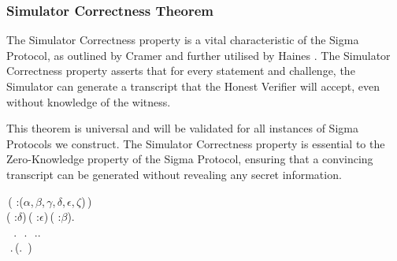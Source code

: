 \subsubsection{Simulator Correctness Theorem}
The Simulator Correctness property is a vital characteristic of the Sigma Protocol, as outlined by Cramer \cite{Cramer1997ModularDO} and further utilised by Haines \cite{Haines2019VerifiedVF}. The Simulator Correctness property asserts that for every statement and challenge, the Simulator can generate a transcript that the Honest Verifier will accept, even without knowledge of the witness. 

This theorem is universal and will be validated for all instances of Sigma Protocols we construct. The Simulator Correctness property is essential to the Zero-Knowledge property of the Sigma Protocol, ensuring that a convincing transcript can be generated without revealing any secret information. 

\begin{holmath}
    \,( :(\ensuremath{\alpha},\,\ensuremath{\beta},\,\ensuremath{\gamma},\,\ensuremath{\delta},\,\ensuremath{\epsilon},\,\ensuremath{\zeta})\,)\,\HOLSymConst{\HOLTokenEquiv{}}\\
\HOLSymConst{\HOLTokenForall{}}( :\ensuremath{\delta})\,( :\ensuremath{\epsilon})\,( :\ensuremath{\beta}).\\
\,\,\,\HOLSymConst{\HOLTokenIn{}}\,.\,\HOLSymConst{\HOLTokenConj{}}\,\,\HOLSymConst{\HOLTokenIn{}}\,.\,\HOLSymConst{\HOLTokenConj{}}\,\,\HOLSymConst{\HOLTokenIn{}}\,..\,\HOLSymConst{\HOLTokenImp{}}\\
\,\,.\,(.\,\,\,)
\end{holmath}  

\newpage
